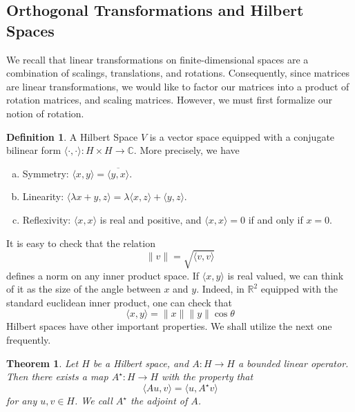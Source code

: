 \documentclass[12pt]{article}
\newcommand{\rr}{\mathbb{R}}
\newcommand{\cc}{\mathbb{C}}
\theoremstyle{plain}
\newtheorem{theorem}{Theorem}
\theoremstyle{definition}
\newtheorem*{definition}{Definition}
\theoremstyle{remark}
\numberwithin{equation}{section}  %
\begin{document}
	\subsection{Orthogonal Transformations and Hilbert Spaces}
	We recall that linear transformations on finite-dimensional spaces are a combination
	of scalings, translations, and rotations. Consequently, since matrices are linear transformations,
	we would like to factor our matrices into a product of rotation matrices, and scaling matrices.
	However, we must first formalize our notion of rotation. 
	\begin{definition}
		A Hilbert Space $V$ is a vector space equipped with a conjugate bilinear form 
		$ \langle \cdot, \cdot \rangle : H \times H \to \cc $. More precisely, we have
		\begin{enumerate}[a)]
		\item{Symmetry:} $\langle x,y \rangle  = \overline{ \langle y,x \rangle   }$.
		\item{Linearity:} $\langle \lambda x + y, z \rangle  =
			\lambda \langle x, z \rangle  + \langle y, z \rangle$.
		\item{Reflexivity:} $\langle x, x \rangle  $ is real and positive, 
			and $\langle x, x \rangle = 0 $ if and only if $x = 0$.            
	\end{enumerate}
\end{definition}
It is easy to check that the relation
\begin{equation*}
	\| v \| = \sqrt{\langle v, v \rangle}
\end{equation*}
defines a norm on any inner product space. If $ \langle x, y \rangle $ is real
valued, we can think of it as the size of the angle between $x$
and $y$. Indeed, in $\rr^2$ equipped with the standard euclidean inner product,
one can check that
\begin{equation*}
	\langle x, y \rangle  = \|x\| \|y\|\cos \theta
\end{equation*}
Hilbert spaces have other important properties. We shall utilize the next one 
frequently. 

\begin{theorem}
	Let $H$ be a Hilbert space, and $A : H \to H$ a bounded linear operator. Then
	there exists a map $A^{\star} : H \to H$ with the property that
	\begin{equation*}
		\langle Au, v \rangle  = \langle u, A^{\star}v \rangle 
	\end{equation*}
	for any $u, v \in H$. We call $A^{\star}$ the \emph{adjoint} of $A$.
\end{theorem}
\end{document}
